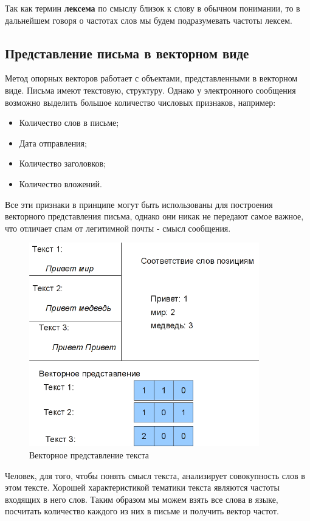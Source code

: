 Так как термин \textbf{лексема} по смыслу близок к слову в обычном понимании, то в дальнейшем говоря о частотах слов мы будем подразумевать частоты лексем.

\subsection{Представление письма в векторном виде}
\label{MESSAGEVECTOR}
Метод опорных векторов работает с объектами, представленными в векторном виде.
Письма имеют текстовую, структуру. Однако у электронного сообщения возможно выделить большое количество
числовых признаков, например:
\begin{itemize}
    \item Количество слов в письме;
    \item Дата отправления;
    \item Количество заголовков;
    \item Количество вложений.
\end{itemize}
Все эти признаки в принципе могут быть использованы для построения векторного
представления письма, однако они никак не передают самое важное, что отличает
спам от легитимной почты - смысл сообщения.

\begin{figure}[h]
\begin{center}
\includegraphics[width=10cm]{img/vectorize}
\end{center}
\caption{Векторное представление текста}
\label{svm-kernel}
\end{figure}

Человек, для того, чтобы понять смысл текста, анализирует совокупность слов в этом тексте.  Хорошей характеристикой тематики текста являются частоты входящих в него слов.
Таким образом мы можем взять все слова в языке, посчитать количество каждого из них в письме
и получить вектор частот.

